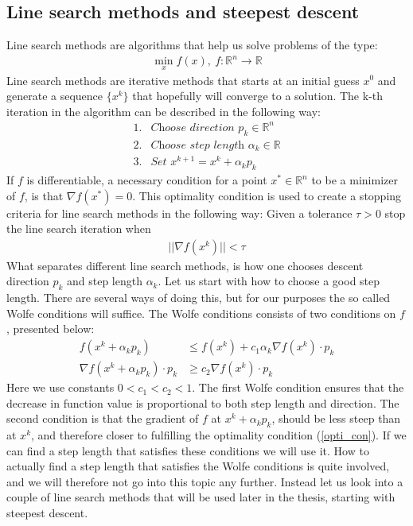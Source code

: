 \subsection{Line search methods and steepest descent}
Line search methods are algorithms that help us solve problems of the type: 
\begin{align*}
\min_x f(x), \ f:\mathbb{R}^n\longrightarrow\mathbb{R}
\end{align*}
Line search methods are iterative methods that starts at an initial guess $x^0$ and generate a sequence $\{x^k\}$ that hopefully will converge to a solution. The k-th iteration in the algorithm can be described in the following way:
\begin{align*}
1. &\textit{Choose direction $p_k\in\mathbb{R}^n$} \\
2. &\textit{Choose step length $\alpha_k\in\mathbb{R}$} \\
3. &\textit{Set $x^{k+1}=x^k + \alpha_kp_k$} 
\end{align*}
If $f$ is differentiable, a necessary condition for a point $x^*\in\mathbb{R}^n$ to be a minimizer of $f$, is that $\nabla f(x^*)=0$. This optimality condition is used to create a stopping criteria for line search methods in the following way: Given a tolerance $\tau>0$ stop the line search iteration when
\begin{align}
||\nabla f(x^k)||<\tau \label{opti_con}
\end{align}  
What separates different line search methods, is how one chooses descent direction $p_k$ and step length $\alpha_k$. Let us start with how to choose a good step length. There are several ways of doing this, but for our purposes the so called Wolfe conditions will suffice. The Wolfe conditions consists of two conditions on $f$, presented below:
\begin{align*}
f(x^k + \alpha_kp_k)&\leq f(x^k) + c_1\alpha_k\nabla f(x^k)\cdot p_k \\
\nabla f(x^k + \alpha_kp_k) \cdot p_k &\geq c_2 \nabla f(x^k)\cdot p_k
\end{align*}
Here we use constants $0<c_1<c_2<1$. The first Wolfe condition ensures that the decrease in function value is proportional to both step length and direction. The second condition is that the gradient of $f$ at $x^k + \alpha_kp_k$, should be less steep than at $x^k$, and therefore closer to fulfilling the optimality condition (\ref{opti_con}). If we can find a step length that satisfies these conditions we will use it. How to actually find a step length that satisfies the Wolfe conditions is quite involved, and we will therefore not go into this topic any further. Instead let us look into a couple of line search methods that will be used later in the thesis, starting with steepest descent.
